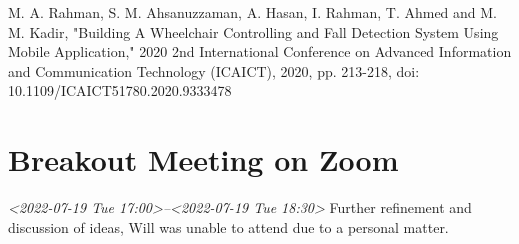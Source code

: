\documentclass[11pt]{article}
\begin{document}
M. A. Rahman, S. M. Ahsanuzzaman, A. Hasan, I. Rahman, T. Ahmed and M. M. Kadir, "Building A Wheelchair Controlling and Fall Detection System Using Mobile Application," 2020 2nd International Conference on Advanced Information and Communication Technology (ICAICT), 2020, pp. 213-218, doi: 10.1109/ICAICT51780.2020.9333478


\section{Breakout Meeting on Zoom}
\label{sec:org68a5f56}
\textit{<2022-07-19 Tue 17:00>--<2022-07-19 Tue 18:30>}
Further refinement and discussion of ideas, Will was unable to attend due to a personal matter.
\end{document}
